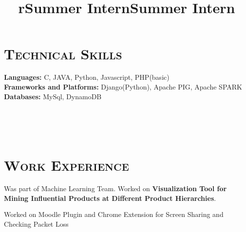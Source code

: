 \begin{resume}


\section{\textsc{Technical Skills}}
\textbf{Languages:}  C, JAVA, Python, Javascript, PHP(basic) \\
\textbf{Frameworks and Platforms:}  Django(Python), Apache PIG, Apache SPARK \\
\textbf{Databases:} MySql, DynamoDB \\



\begin{formatb}
  \title{r}\\
  \\
  \body\\
\end{formatb}

\section{\textsc{Work Experience}}

\title{Summer Intern}
\begin{position}
Was part of Machine Learning Team. Worked on \textbf{Visualization Tool for Mining
Influential Products at Different Product Hierarchies}.
\end{position}

\title{Summer Intern}
\begin{position}
Worked on Moodle Plugin and Chrome Extension for Screen Sharing and Checking Packet Loss
\end{position}









\end{resume}
